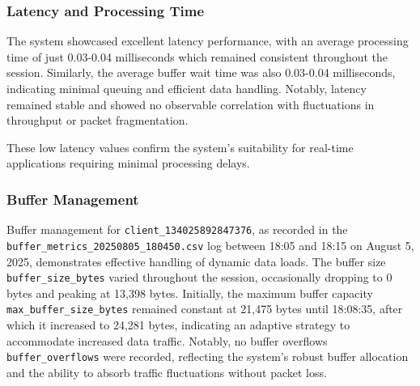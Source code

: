 \subsubsection{Latency and Processing Time}
The system showcased excellent latency performance, with an average processing time of just 0.03-0.04 milliseconds which remained consistent throughout the session. Similarly, the average buffer wait time was also 0.03-0.04 milliseconds, indicating minimal queuing and efficient data handling. Notably, latency remained stable and showed no observable correlation with fluctuations in throughput or packet fragmentation.

These low latency values confirm the system's suitability for real-time applications requiring minimal processing delays.

\subsubsection{Buffer Management}
Buffer management for \texttt{client\_134025892847376}, as recorded in the \texttt{buffer\_metrics\allowbreak{}\_20250805\_180450.csv} log between 18:05 and 18:15 on August 5, 2025, demonstrates effective handling of dynamic data loads. The buffer size \texttt{buffer\_size\_bytes} varied throughout the session, occasionally dropping to 0 bytes and peaking at 13{,}398 bytes. Initially, the maximum buffer capacity \texttt{max\_buffer\_size\_bytes} remained constant at 21{,}475 bytes until 18:08:35, after which it increased to 24{,}281 bytes, indicating an adaptive strategy to accommodate increased data traffic. Notably, no buffer overflows \texttt{buffer\_overflows} were recorded, reflecting the system’s robust buffer allocation and the ability to absorb traffic fluctuations without packet loss.

